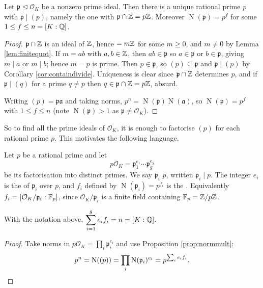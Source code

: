 \documentclass[a4paper]{scrartcl}
\renewcommand{\OO}{\mathcal{O}}
\newcommand{\Nm}{\operatorname{N}}
\newcommand{\fa}{\mathfrak{a}}
\newcommand{\fp}{\mathfrak{p}}
\begin{document}
\begin{lemma}\label{lem:primeabovep}
	Let $\fp \trianglelefteq \OO_K$ be a nonzero prime ideal. Then there is a unique rational prime $p$ with $\fp \mid (p)$, namely the one with $\fp \cap \Z = p\Z$. Moreover $\Nm(\fp) = p^f$ for some $1 \leq f \leq n = [K:\mathbb{Q}]$.
\end{lemma}

\begin{proof}
	$\fp \cap \Z$ is an ideal of $\mathbb{Z}$, hence $= m\mathbb{Z}$ for some $m \geq 0$, and $m \neq 0$ by Lemma \ref{lem:finitequot}. If $m = ab$ with $a,b \in \mathbb{Z}$, then $ab \in \fp$ so $a \in \fp$ or $b \in \fp$, giving $m \mid a$ or $m \mid b$; hence $m = p$ is prime. Then $p \in \fp$, so $(p) \subseteq \fp$ and $\fp \mid (p)$ by Corollary \ref{cor:containdivide}. Uniqueness is clear since $\fp \cap \Z$ determines $p$, and if $\fp \mid (q)$ for a prime $q \neq p$ then $q \in \fp\cap\Z = p\Z$, absurd.

	Writing $(p) = \fp\fa$ and taking norms, $p^n = \Nm(\fp)\Nm(\fa)$, so $\Nm(\fp) = p^f$ with $1 \le f \le n$ (note $\Nm(\fp) > 1$ as $\fp \neq \OO_K$).
\end{proof}

So to find all the prime ideals of $\OO_K$, it is enough to factorise $(p)$ for each rational prime $p$. This motivates the following language.

\begin{definition}
	Let $p$ be a rational prime and let
	$$p\OO_K = \fp_1^{e_1}\cdots\fp_g^{e_g}$$
	be its factorisation into distinct primes. We say $\fp_i$  $p$, written $\fp_i \mid p$. The integer $e_i$ is the  of $\fp_i$ over $p$, and $f_i$ defined by $\Nm(\fp_i) = p^{f_i}$ is the . Equivalently $f_i = [\OO_K/\fp_i : \F_p]$, since $\OO_K/\fp_i$ is a finite field containing $\mathbb{F}_p = \mathbb{Z}/p\mathbb{Z}$.
\end{definition}

\begin{theorem}\label{thm:efg}
	With the notation above, $\displaystyle\sum_{i=1}^g e_if_i = n = [K:\mathbb{Q}]$.
\end{theorem}

\begin{proof}
	Take norms in $p\OO_K = \prod_i\fp_i^{e_i}$ and use Proposition \ref{prop:normmult}:
	$$p^n = \Nm((p)) = \prod_i\Nm(\fp_i)^{e_i} = p^{\sum_i e_if_i}. \qedhere$$
\end{proof}
\end{document}
